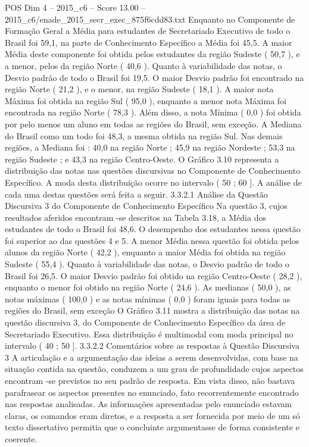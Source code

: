 \begin{textsample}{POS Dim 4 – 2015\_c6 – Score 13.00 – 2015\_c6/enade\_2015\_secr\_exec\_875f6cdd83.txt}
Enquanto no Componente de Formação Geral a Média para estudantes de Secretariado Executivo de todo o Brasil foi 59,1, na parte de Conhecimento Específico a Média foi 45,5.
A maior Média deste componente foi obtida pelos estudantes da região Sudeste ( 50,7 ), e a menor, pelos da região Norte ( 40,6 ).
Quanto à variabilidade das notas, o Desvio padrão de todo o Brasil foi 19,5.
O maior Desvio padrão foi encontrado na região Norte ( 21,2 ), e o menor, na região Sudeste ( 18,1 ).
A maior nota Máxima foi obtida na região Sul ( 95,0 ), enquanto a menor nota Máxima foi encontrada na região Norte ( 78,3 ).
Além disso, a nota Mínima ( 0,0 ) foi obtida por pelo menos um aluno em todas as regiões do Brasil, sem exceção.
A Mediana do Brasil como um todo foi 48,3, a mesma obtida na região Sul.
Nas demais regiões, a Mediana foi : 40,0 na região Norte ; 45,9 na região Nordeste ; 53,3 na região Sudeste ; e 43,3 na região Centro-Oeste.
O Gráfico 3.10 representa a distribuição das notas nas questões discursivas no Componente de Conhecimento Específico.
A moda desta distribuição ocorre no intervalo ( 50 ; 60 ].
A análise de cada uma destas questões será feita a seguir. 3.3.2.1 Análise da Questão Discursiva 3 do Componente de Conhecimento Específico Na questão 3, cujos resultados aferidos encontram -se descritos na Tabela 3.18, a Média dos estudantes de todo o Brasil foi 48,6.
O desempenho dos estudantes nessa questão foi superior ao das questões 4 e 5.
A menor Média nessa questão foi obtida pelos alunos da região Norte ( 42,2 ), enquanto a maior Média foi obtida na região Sudeste ( 55,4 ).
Quanto à variabilidade das notas, o Desvio padrão de todo o Brasil foi 26,5.
O maior Desvio padrão foi obtido na região Centro-Oeste ( 28,2 ), enquanto o menor foi obtido na região Norte ( 24,6 ).
As medianas ( 50,0 ), as notas máximas ( 100,0 ) e as notas mínimas ( 0,0 ) foram iguais para todas as regiões do Brasil, sem exceção O Gráfico 3.11 mostra a distribuição das notas na questão discursiva 3, do Componente de Conhecimento Específico da área de Secretariado Executivo.
Essa distribuição é multimodal com moda principal no intervalo ( 40 ; 50 ]. 3.3.2.2 Comentários sobre as respostas à Questão Discursiva 3 A articulação e a argumentação das ideias a serem desenvolvidas, com base na situação contida na questão, conduzem a um grau de profundidade cujos aspectos encontram -se previstos no seu padrão de resposta.
Em vista disso, não bastava parafrasear os aspectos presentes no enunciado, fato recorrentemente encontrado nas respostas analisadas.
As informações apresentadas pelo enunciado estavam claras, os comandos eram diretos, e a resposta a ser fornecida por meio de um só texto dissertativo permitia que o concluinte argumentasse de forma consistente e coerente.

\end{textsample}
